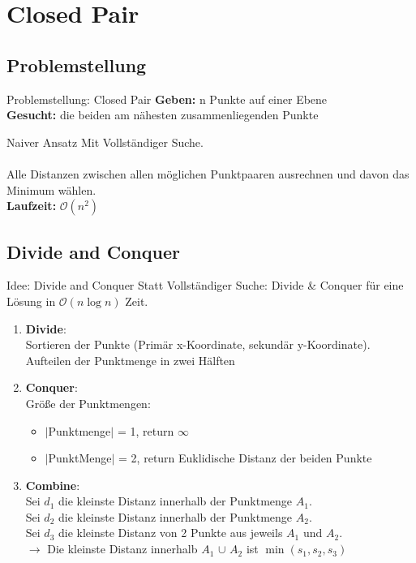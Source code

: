 \documentclass[18pt]{beamer}
\begin{document}
	
\section{Closed Pair}

	\subsection{Problemstellung}
		\begin{frame}{Problemstellung: Closed Pair}
			\textbf{Geben:} n Punkte auf einer Ebene \\
			\textbf{Gesucht:} die beiden am nähesten zusammenliegenden Punkte\\
		
			\begin{block}{Naiver Ansatz}
				Mit Vollständiger Suche. \\
				\ \\
				Alle Distanzen zwischen allen möglichen Punktpaaren ausrechnen und davon das Minimum wählen. 
				\ \\
				\textbf{Laufzeit:} $\mathcal{O}(n^2)$
			\end{block}	
		\end{frame}
	
	\subsection{Divide and Conquer}
		\begin{frame}{Idee: Divide and Conquer}
			Statt Vollständiger Suche: Divide \& Conquer für eine Lösung in $\mathcal{O}(n \log n)$ Zeit.

			\begin{enumerate}
				\item \textbf{Divide}:\\ Sortieren der Punkte (Primär x-Koordinate, sekundär y-Koordinate). Aufteilen der Punktmenge in zwei Hälften
				\item \textbf{Conquer}:\\ Größe der Punktmengen:
					\begin{itemize}
						\item $|$Punktmenge$|$ = 1, return $ \infty$
						\item $|$PunktMenge$|$ = 2, return Euklidische Distanz der beiden Punkte
					\end{itemize}
				\item \textbf{Combine}: \\ Sei $d_{1}$ die kleinste Distanz innerhalb der Punktmenge $A_1$. \\
							Sei $d_2$ die kleinste Distanz innerhalb der Punktmenge $A_2$. \\
							Sei $d_{3}$ die kleinste Distanz von 2 Punkte aus jeweils $A_{1}$ und $A_{2}$.\\
							$\rightarrow$ Die kleinste Distanz innerhalb $A_1$ $\cup$ $A_2$ ist $\min(s_1,s_2, s_3)$ \\
			\end{enumerate}
		\end{frame}
\end{document}
